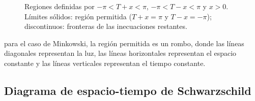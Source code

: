 \begin{figure}[H]
    \caption{Regiones definidas por \(-\pi<T+x<\pi\), \(-\pi<T-x<\pi\) y \(x>0\). Límites sólidos: región permitida (\(T+x=\pi\) y \(T-x=-\pi\)); discontinuos: fronteras de las inecuaciones restantes.}
\end{figure}

para el caso de Minkowski, la región permitida es un rombo, donde las líneas diagonales representan la luz, las líneas horizontales representan el espacio constante y las líneas verticales representan el tiempo constante.

\subsection{Diagrama de espacio-tiempo de Schwarzschild}



